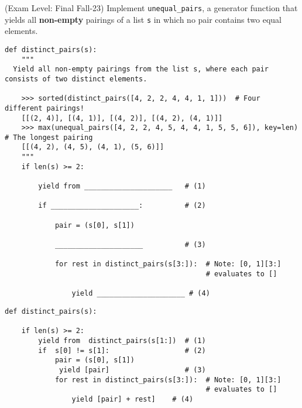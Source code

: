 \begin{blocksection}
\question(Exam Level: Final Fall-23) Implement \texttt{unequal\_pairs}, a generator function that yields all \textbf{non-empty} pairings of a list \texttt{s} in which no pair contains two equal elements.

\begin{lstlisting}
def distinct_pairs(s):
    """
  Yield all non-empty pairings from the list s, where each pair consists of two distinct elements.

    >>> sorted(distinct_pairs([4, 2, 2, 4, 4, 1, 1]))  # Four different pairings!
    [[(2, 4)], [(4, 1)], [(4, 2)], [(4, 2), (4, 1)]]
    >>> max(unequal_pairs([4, 2, 2, 4, 5, 4, 4, 1, 5, 5, 6]), key=len)  # The longest pairing
    [[(4, 2), (4, 5), (4, 1), (5, 6)]]
    """
    if len(s) >= 2:

        yield from _____________________   # (1)

        if _____________________:          # (2)

            pair = (s[0], s[1])

            _____________________          # (3)

            for rest in distinct_pairs(s[3:]):  # Note: [0, 1][3:]  
                                                # evaluates to []

                yield _____________________ # (4)
\end{lstlisting}

\end{blocksection}

\begin{blocksection}
\begin{solution}[0in]

\begin{lstlisting}
def distinct_pairs(s):
 
    if len(s) >= 2:
        yield from  distinct_pairs(s[1:])  # (1)
        if  s[0] != s[1]:                  # (2)
            pair = (s[0], s[1])
             yield [pair]                  # (3)
            for rest in distinct_pairs(s[3:]):  # Note: [0, 1][3:]  
                                                # evaluates to []
                yield [pair] + rest]    # (4)
\end{lstlisting}

\end{solution}
\end{blocksection}